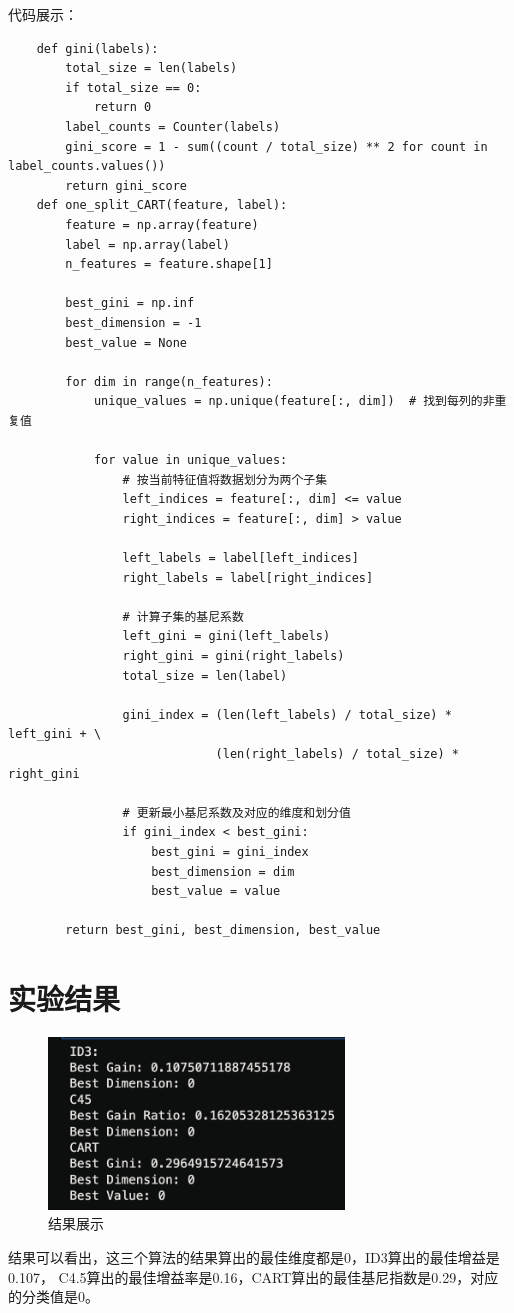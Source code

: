 \documentclass[12pt,a4paper,oneside]{article}
\begin{document}
代码展示：
\begin{lstlisting}
    def gini(labels):
        total_size = len(labels)
        if total_size == 0:
            return 0
        label_counts = Counter(labels)
        gini_score = 1 - sum((count / total_size) ** 2 for count in label_counts.values())
        return gini_score
    def one_split_CART(feature, label):
        feature = np.array(feature)
        label = np.array(label)
        n_features = feature.shape[1]
        
        best_gini = np.inf
        best_dimension = -1
        best_value = None
    
        for dim in range(n_features):
            unique_values = np.unique(feature[:, dim])  # 找到每列的非重复值
            
            for value in unique_values:
                # 按当前特征值将数据划分为两个子集
                left_indices = feature[:, dim] <= value
                right_indices = feature[:, dim] > value
                
                left_labels = label[left_indices]
                right_labels = label[right_indices]
                
                # 计算子集的基尼系数
                left_gini = gini(left_labels)
                right_gini = gini(right_labels)
                total_size = len(label)
                
                gini_index = (len(left_labels) / total_size) * left_gini + \
                             (len(right_labels) / total_size) * right_gini
                
                # 更新最小基尼系数及对应的维度和划分值
                if gini_index < best_gini:
                    best_gini = gini_index
                    best_dimension = dim
                    best_value = value
    
        return best_gini, best_dimension, best_value
\end{lstlisting}

\section{实验结果}
\begin{figure}[H]
    \centering
    \includegraphics[width=0.7\textwidth]{image/4.png}
    \caption{结果展示}
\end{figure}
\qquad 结果可以看出，这三个算法的结果算出的最佳维度都是0，ID3算出的最佳增益是0.107，
C4.5算出的最佳增益率是0.16，CART算出的最佳基尼指数是0.29，对应的分类值是0。
\end{document}
